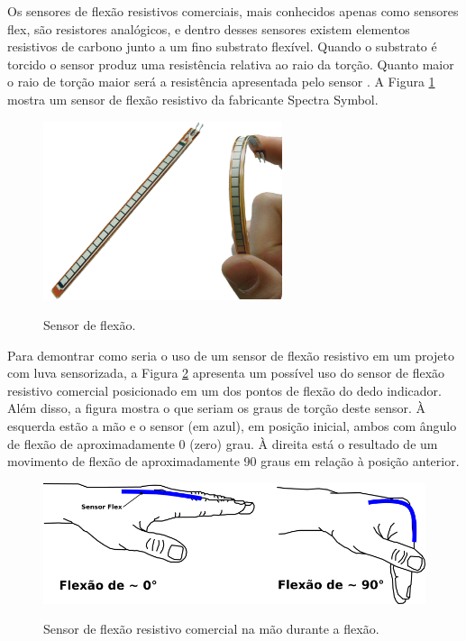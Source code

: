 \documentclass[
	12pt,				%
	openright,			%
	oneside,			%
	a4paper,			%
	english,			%
	brazil				%
	]{abntex2}
\begin{document}
		Os sensores de flexão resistivos comerciais, mais conhecidos apenas como sensores flex, são resistores analógicos, e dentro desses sensores existem elementos resistivos de carbono junto a um fino substrato flexível. Quando o substrato é torcido o sensor produz uma resistência relativa ao raio da torção. Quanto maior o raio de torção maior será a resistência apresentada pelo sensor \cite{solanki2013sign}. A Figura \ref{Fig:flex-sensor1} mostra um sensor de flexão resistivo da fabricante Spectra Symbol.

	\begin{figure}[!h]
		\centering
		\caption{Sensor de flexão.}
		\includegraphics[width=7cm,keepaspectratio=true]{./figures/flex-sensor1.png}
		\label{Fig:flex-sensor1}
	\end{figure}


		Para demontrar como seria o uso de um sensor de flexão resistivo em um projeto com luva sensorizada, a Figura \ref{Fig:hand-flexsensor-degrees1} apresenta um possível uso do sensor de flexão resistivo comercial posicionado em um dos pontos de flexão do dedo indicador. Além disso, a figura mostra o que seriam os graus de torção deste sensor. À esquerda estão a mão e o sensor (em azul), em posição inicial, ambos com ângulo de flexão de aproximadamente 0 (zero) grau. À direita está o resultado de um movimento de flexão de aproximadamente 90 graus em relação à posição anterior.


	\begin{figure}[!h]
		\centering
		\caption{Sensor de flexão resistivo comercial na mão durante a flexão.}
		\includegraphics[width=13cm,keepaspectratio=true]{./figures/hand-flexsensor-degrees1.png}
		\label{Fig:hand-flexsensor-degrees1}
	\end{figure}
\end{document}
